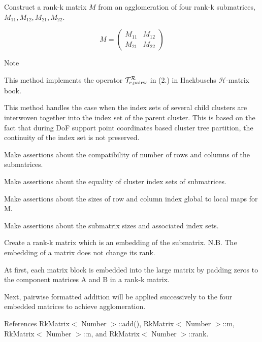 Construct a rank-\/k matrix $M$ from an agglomeration of four rank-\/k submatrices, $M_{11}, M_{12}, M_{21}, M_{22}$.

\[ M = \begin{pmatrix} M_{11} & M_{12} \\ M_{21} & M_{22} \end{pmatrix} \]


\begin{DoxyDescription}
\item[Note ]
\begin{DoxyEnumerate}
\item This method implements the operator $\mathcal{T}_{r, {\rm pairw}}^{\mathcal{R}}$ in (2.) in Hackbusch\textquotesingle{}s $\mathcal{H}$-\/matrix book.
\item This method handles the case when the index sets of several child clusters are interwoven together into the index set of the parent cluster. This is based on the fact that during DoF support point coordinates based cluster tree partition, the continuity of the index set is not preserved.  
\end{DoxyEnumerate}
\end{DoxyDescription}Make assertions about the compatibility of number of rows and columns of the submatrices.

Make assertions about the equality of cluster index sets of submatrices.

Make assertions about the sizes of row and column index global to local maps for {\ttfamily M}.

Make assertions about the submatrix sizes and associated index sets.

Create a rank-\/k matrix which is an embedding of the submatrix. N.\+B. The embedding of a matrix does not change its rank.

At first, each matrix block is embedded into the large matrix by padding zeros to the component matrices {\ttfamily A} and {\ttfamily B} in a rank-\/k matrix.

Next, pairwise formatted addition will be applied successively to the four embedded matrices to achieve agglomeration.

References Rk\+Matrix$<$ Number $>$\+::add(), Rk\+Matrix$<$ Number $>$\+::m, Rk\+Matrix$<$ Number $>$\+::n, and Rk\+Matrix$<$ Number $>$\+::rank.

\mbox{\label{classRkMatrix_a5f886128ba604cc85f99e3c9c9a07e7c}} 
